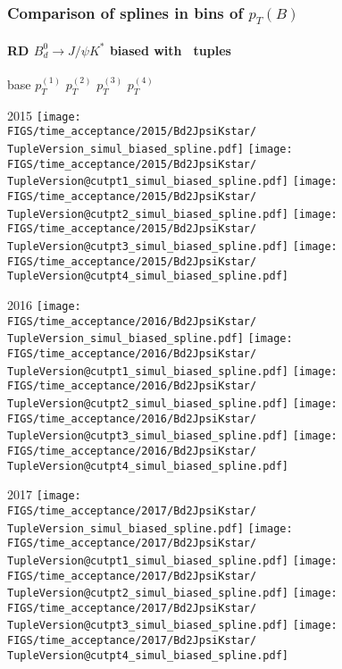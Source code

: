 \begin{frame} %
\frametitle{Comparison of splines in bins of $p_T(B)$}
\framesubtitle{RD $B_d^0\rightarrow J/\psi K^*$ biased with \TupleVersion\, tuples}

  \phantom{2020} base \hspace*{1.5cm} $p_T^{(1)}$ \hspace*{1.5cm} $p_T^{(2)}$ \hspace*{1.5cm} $p_T^{(3)}$ \hspace*{1.5cm} $p_T^{(4)}$

  2015
  \texttt{[image: \\FIGS/time\_acceptance/2015/Bd2JpsiKstar/\\TupleVersion\_simul\_biased\_spline.pdf]}
  \texttt{[image: \\FIGS/time\_acceptance/2015/Bd2JpsiKstar/\\TupleVersion@cutpt1\_simul\_biased\_spline.pdf]}
  \texttt{[image: \\FIGS/time\_acceptance/2015/Bd2JpsiKstar/\\TupleVersion@cutpt2\_simul\_biased\_spline.pdf]}
  \texttt{[image: \\FIGS/time\_acceptance/2015/Bd2JpsiKstar/\\TupleVersion@cutpt3\_simul\_biased\_spline.pdf]}
  \texttt{[image: \\FIGS/time\_acceptance/2015/Bd2JpsiKstar/\\TupleVersion@cutpt4\_simul\_biased\_spline.pdf]}
  \vspace*{2mm}

  2016
  \texttt{[image: \\FIGS/time\_acceptance/2016/Bd2JpsiKstar/\\TupleVersion\_simul\_biased\_spline.pdf]}
  \texttt{[image: \\FIGS/time\_acceptance/2016/Bd2JpsiKstar/\\TupleVersion@cutpt1\_simul\_biased\_spline.pdf]}
  \texttt{[image: \\FIGS/time\_acceptance/2016/Bd2JpsiKstar/\\TupleVersion@cutpt2\_simul\_biased\_spline.pdf]}
  \texttt{[image: \\FIGS/time\_acceptance/2016/Bd2JpsiKstar/\\TupleVersion@cutpt3\_simul\_biased\_spline.pdf]}
  \texttt{[image: \\FIGS/time\_acceptance/2016/Bd2JpsiKstar/\\TupleVersion@cutpt4\_simul\_biased\_spline.pdf]}
  \vspace*{2mm}

  2017
  \texttt{[image: \\FIGS/time\_acceptance/2017/Bd2JpsiKstar/\\TupleVersion\_simul\_biased\_spline.pdf]}
  \texttt{[image: \\FIGS/time\_acceptance/2017/Bd2JpsiKstar/\\TupleVersion@cutpt1\_simul\_biased\_spline.pdf]}
  \texttt{[image: \\FIGS/time\_acceptance/2017/Bd2JpsiKstar/\\TupleVersion@cutpt2\_simul\_biased\_spline.pdf]}
  \texttt{[image: \\FIGS/time\_acceptance/2017/Bd2JpsiKstar/\\TupleVersion@cutpt3\_simul\_biased\_spline.pdf]}
  \texttt{[image: \\FIGS/time\_acceptance/2017/Bd2JpsiKstar/\\TupleVersion@cutpt4\_simul\_biased\_spline.pdf]}
  \vspace*{2mm}


\end{frame}
